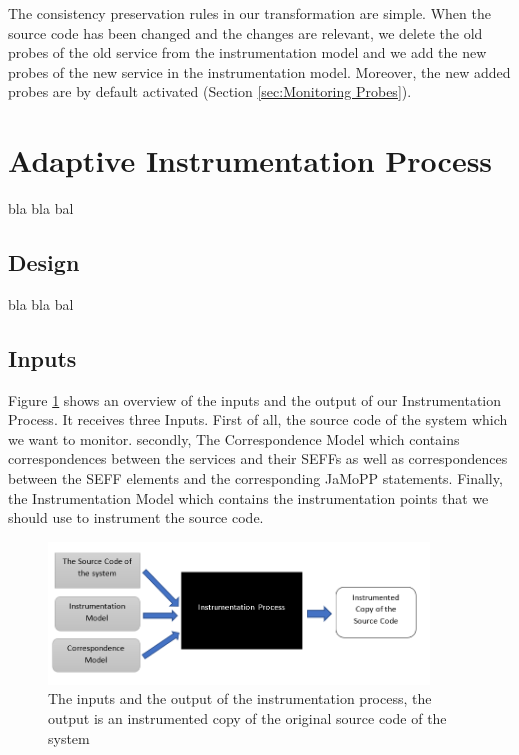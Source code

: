 The consistency preservation rules in our transformation are simple. When the source code has been changed and the changes are relevant, we delete the old probes of the old service from the instrumentation model and we add the new probes of the new service in the instrumentation model. Moreover, the new added probes are by default activated (Section \ref{sec:Monitoring Probes}). \\

\section{Adaptive Instrumentation Process}
\label{sec:Adaptive Instrumentation Process}
bla bla bal
\subsection{Design}
\label{sec:Design}
bla bla bal
\subsection{Inputs}
\label{sec:Inputs}

Figure \ref{fig:approach_design} shows an overview of the inputs and the output of our Instrumentation Process. It receives three Inputs. First of all, the source code of the system which we want to monitor. secondly, The Correspondence Model which contains correspondences between the services and their SEFFs as well as correspondences between the SEFF elements and the corresponding JaMoPP statements. Finally, the Instrumentation Model which contains the instrumentation points that we should use to instrument the source code. 

\begin{figure}[h]
\centering
\includegraphics[width=0.9\textwidth]{figures/approach_design}
\caption{The inputs and the output of the instrumentation process, the output is an instrumented copy of the original source code of the system}
\label{fig:approach_design}
\end{figure}

